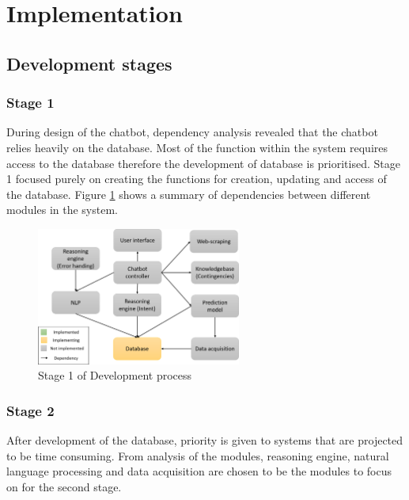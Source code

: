 \documentclass[11pt]{article}
\begin{document}
\section{Implementation}
\subsection{Development stages} \label{Dev. stages}
\subsubsection{Stage 1}
During design of the chatbot, dependency analysis revealed that the chatbot relies heavily on the database. Most of the function within the system requires access to the database therefore the development of database is prioritised. Stage 1 focused purely on creating the functions for creation, updating and access of the database. Figure \ref{fig:Stage 1} shows a summary of dependencies between different modules in the system.
\begin{figure}[!htb]
	\centering
	\includegraphics[width=0.6\textwidth]{Stage_1}
	\caption{Stage 1 of Development process }\label{fig:Stage 1}
\end{figure}

\subsubsection{Stage 2}
After development of the database, priority is given to systems that are projected to be time consuming. From analysis of the modules, reasoning engine, natural language processing and data acquisition are chosen to be the modules to focus on for the second stage. 
\end{document}
